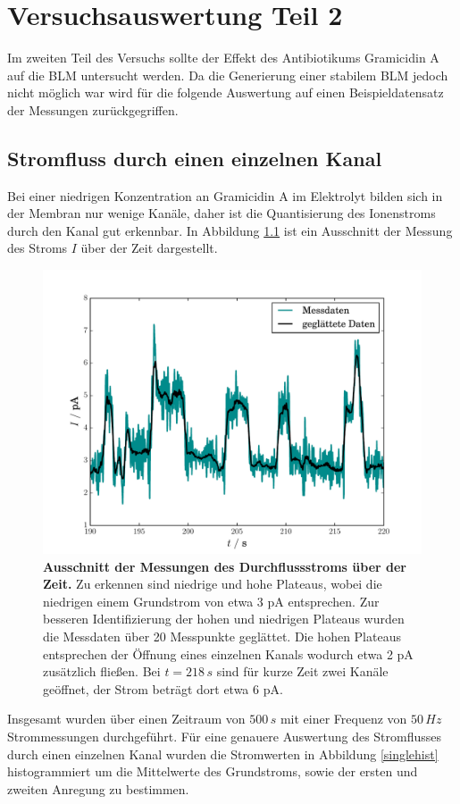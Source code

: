 \documentclass{include/thesisclass3}
\newcommand{\e}[1]{\,\si{#1}}
\begin{document}
\chapter{Versuchsauswertung Teil 2}
Im zweiten Teil des Versuchs sollte der Effekt des Antibiotikums Gramicidin A auf die BLM untersucht werden. Da die Generierung einer stabilem BLM jedoch nicht möglich war wird für die folgende Auswertung auf einen Beispieldatensatz der Messungen zurückgegriffen.

\section{Stromfluss durch einen einzelnen Kanal}
Bei einer niedrigen Konzentration an Gramicidin A im Elektrolyt bilden sich in der Membran nur wenige Kanäle, daher ist die Quantisierung des Ionenstroms durch den Kanal gut erkennbar. In Abbildung \ref{singlechannel} ist ein Ausschnitt der Messung des Stroms $I$ über der Zeit dargestellt.
\begin{figure}[H]
\centering
\includegraphics[scale=0.7]{images/ssingle_channel.pdf}
\caption{\textbf{Ausschnitt der Messungen des Durchflussstroms über der Zeit.} Zu erkennen sind niedrige und hohe Plateaus, wobei die niedrigen einem Grundstrom von etwa 3 pA entsprechen. Zur besseren Identifizierung der hohen und niedrigen Plateaus wurden die Messdaten über 20 Messpunkte geglättet. Die hohen Plateaus entsprechen der Öffnung eines einzelnen Kanals wodurch etwa 2 pA zusätzlich fließen. Bei $t = 218\e{s}$ sind für kurze Zeit zwei Kanäle geöffnet, der Strom beträgt dort etwa 6 pA.}
\label{singlechannel}
\end{figure}
Insgesamt wurden über einen Zeitraum von $500\e{s}$ mit einer Frequenz von $50\e{Hz}$ Strommessungen durchgeführt. Für eine genauere Auswertung des Stromflusses durch einen einzelnen Kanal wurden die Stromwerten in Abbildung \ref{singlehist} histogrammiert um die Mittelwerte des Grundstroms, sowie der ersten und zweiten Anregung zu bestimmen.
\end{document}
